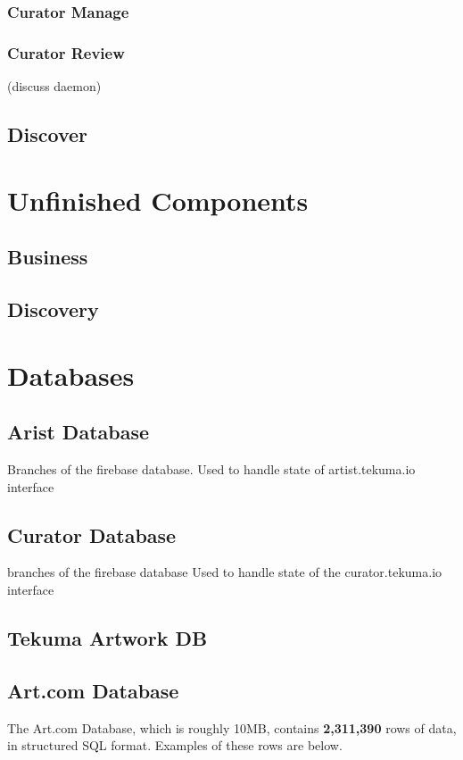 \documentclass[fontsize=12pt]{scrartcl} %
\numberwithin{equation}{section} %
\numberwithin{figure}{section} %
\numberwithin{table}{section} %
\begin{document}
\subsubsection{Curator Manage}
\subsubsection{Curator Review}
(discuss daemon)
\subsection{Discover}


\section{Unfinished Components}
\subsection{Business}
\subsection{Discovery}

\section{Databases}
\subsection{Arist Database}
Branches of the firebase database.
Used to handle state of artist.tekuma.io interface

\subsection{Curator Database}
branches of the firebase database
Used to handle state of the curator.tekuma.io interface

\subsection{Tekuma Artwork DB}

\subsection{Art.com Database}
The Art.com Database, which is roughly 10MB, contains \textbf{2,311,390} rows of data, in structured SQL format. Examples of these rows are below.\\
\end{document}
